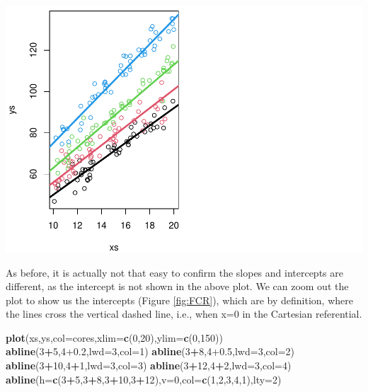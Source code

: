\documentclass[
]{book}
\newenvironment{Shaded}{\begin{snugshade}}{\end{snugshade}}
\newcommand{\DataTypeTok}[1]{\textcolor[rgb]{0.13,0.29,0.53}{#1}}
\newcommand{\DecValTok}[1]{\textcolor[rgb]{0.00,0.00,0.81}{#1}}
\newcommand{\FloatTok}[1]{\textcolor[rgb]{0.00,0.00,0.81}{#1}}
\newcommand{\KeywordTok}[1]{\textcolor[rgb]{0.13,0.29,0.53}{\textbf{#1}}}
\newcommand{\NormalTok}[1]{#1}
\newcommand{\OperatorTok}[1]{\textcolor[rgb]{0.81,0.36,0.00}{\textbf{#1}}}
\begin{document}
\includegraphics{ECOMODbook_files/figure-latex/a11.6-1.pdf}

As before, it is actually not that easy to confirm the slopes and intercepts are different, as the intercept is not shown in the above plot. We can zoom out the plot to show us the intercepts (Figure \ref{fig:FCR}), which are by definition, where the lines cross the vertical dashed line, i.e., when x=0 in the Cartesian referential.

\begin{Shaded}
\begin{Highlighting}[]
\KeywordTok{plot}\NormalTok{(xs,ys,}\DataTypeTok{col=}\NormalTok{cores,}\DataTypeTok{xlim=}\KeywordTok{c}\NormalTok{(}\DecValTok{0}\NormalTok{,}\DecValTok{20}\NormalTok{),}\DataTypeTok{ylim=}\KeywordTok{c}\NormalTok{(}\DecValTok{0}\NormalTok{,}\DecValTok{150}\NormalTok{))}
\KeywordTok{abline}\NormalTok{(}\DecValTok{3}\OperatorTok{+}\DecValTok{5}\NormalTok{,}\DecValTok{4}\FloatTok{+0.2}\NormalTok{,}\DataTypeTok{lwd=}\DecValTok{3}\NormalTok{,}\DataTypeTok{col=}\DecValTok{1}\NormalTok{)}
\KeywordTok{abline}\NormalTok{(}\DecValTok{3}\OperatorTok{+}\DecValTok{8}\NormalTok{,}\DecValTok{4}\FloatTok{+0.5}\NormalTok{,}\DataTypeTok{lwd=}\DecValTok{3}\NormalTok{,}\DataTypeTok{col=}\DecValTok{2}\NormalTok{)}
\KeywordTok{abline}\NormalTok{(}\DecValTok{3}\OperatorTok{+}\DecValTok{10}\NormalTok{,}\DecValTok{4}\OperatorTok{+}\DecValTok{1}\NormalTok{,}\DataTypeTok{lwd=}\DecValTok{3}\NormalTok{,}\DataTypeTok{col=}\DecValTok{3}\NormalTok{)}
\KeywordTok{abline}\NormalTok{(}\DecValTok{3}\OperatorTok{+}\DecValTok{12}\NormalTok{,}\DecValTok{4}\OperatorTok{+}\DecValTok{2}\NormalTok{,}\DataTypeTok{lwd=}\DecValTok{3}\NormalTok{,}\DataTypeTok{col=}\DecValTok{4}\NormalTok{)}
\KeywordTok{abline}\NormalTok{(}\DataTypeTok{h=}\KeywordTok{c}\NormalTok{(}\DecValTok{3}\OperatorTok{+}\DecValTok{5}\NormalTok{,}\DecValTok{3}\OperatorTok{+}\DecValTok{8}\NormalTok{,}\DecValTok{3}\OperatorTok{+}\DecValTok{10}\NormalTok{,}\DecValTok{3}\OperatorTok{+}\DecValTok{12}\NormalTok{),}\DataTypeTok{v=}\DecValTok{0}\NormalTok{,}\DataTypeTok{col=}\KeywordTok{c}\NormalTok{(}\DecValTok{1}\NormalTok{,}\DecValTok{2}\NormalTok{,}\DecValTok{3}\NormalTok{,}\DecValTok{4}\NormalTok{,}\DecValTok{1}\NormalTok{),}\DataTypeTok{lty=}\DecValTok{2}\NormalTok{)}
\end{Highlighting}
\end{Shaded}
\end{document}
